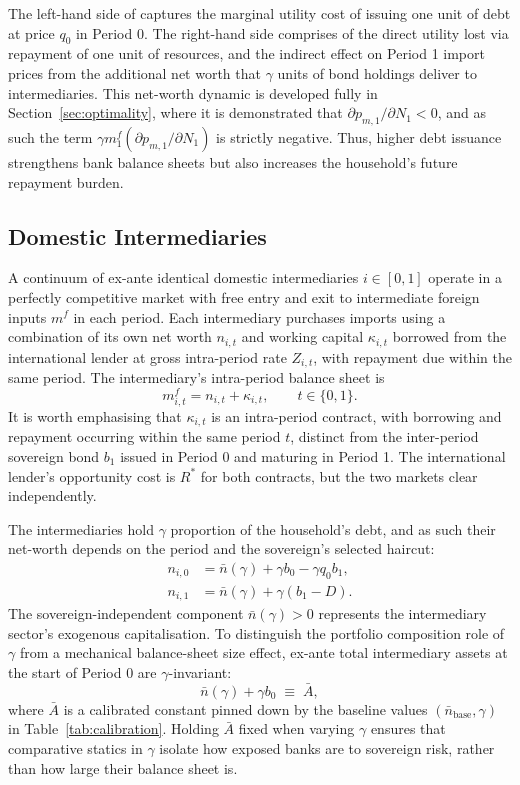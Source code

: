 \documentclass[11pt]{article}
\theoremstyle{definition}
\theoremstyle{plain}
\theoremstyle{remark}
\newcommand{\mf}{m^{f}}
\newcommand{\Rstar}{R^{*}}
\begin{document}
The left-hand side of captures the marginal utility cost of issuing one unit of debt at price $q_0$ in Period 0. The right-hand side comprises of the direct utility lost via repayment of one unit of resources, and the indirect effect on Period 1 import prices from the additional net worth that $\gamma$ units of bond holdings deliver to intermediaries. This net-worth dynamic is developed fully in Section~\ref{sec:optimality}, where it is demonstrated that $\partial p_{m,1}/\partial N_1 < 0$, and as such the term $\gamma \mf_1 (\partial p_{m,1}/\partial N_1)$ is strictly negative. Thus, higher debt issuance strengthens bank balance sheets but also increases the household's future repayment burden.

\subsection{Domestic Intermediaries}\label{sec:intermediary}

A continuum of ex-ante identical domestic intermediaries $i \in [0,1]$ operate in a perfectly competitive market with free entry and exit to intermediate foreign inputs $\mf$ in each period. Each intermediary purchases imports using a combination of its own net worth $n_{i,t}$ and working capital $\kappa_{i,t}$ borrowed from the international lender at gross intra-period rate $Z_{i,t}$, with repayment due within the same period. The intermediary's intra-period balance sheet is
\begin{equation}\label{eq:balsheet}
 \mf_{i,t} = n_{i,t} + \kappa_{i,t}, \qquad t \in \{0,1\}.
\end{equation}
It is worth emphasising that $\kappa_{i,t}$ is an intra-period contract, with borrowing and repayment occurring within the same period $t$, distinct from the inter-period sovereign bond $b_1$ issued in Period 0 and maturing in Period 1. The international lender's opportunity cost is $\Rstar$ for both contracts, but the two markets clear independently.

The intermediaries hold $\gamma$ proportion of the household's debt, and as such their net-worth depends on the period and the sovereign's selected haircut:
\begin{align}
n_{i,0} &= \bar{n}(\gamma) + \gamma b_0 - \gamma q_0 b_1, \label{eq:nw0}\\
n_{i,1} &= \bar{n}(\gamma) + \gamma(b_1 - D). \label{eq:nw1}
\end{align}
The sovereign-independent component $\bar{n}(\gamma) > 0$ represents the intermediary sector's exogenous capitalisation. To distinguish the portfolio composition role of $\gamma$ from a mechanical balance-sheet size effect, ex-ante total intermediary assets at the start of Period 0 are $\gamma$-invariant:
\begin{equation}\label{eq:nbar_rescale}
\bar{n}(\gamma) + \gamma b_0 \;\equiv\; \bar{A},
\end{equation}
where $\bar{A}$ is a calibrated constant pinned down by the baseline values $(\bar{n}_{\text{base}}, \gamma)$ in Table~\ref{tab:calibration}. Holding $\bar{A}$ fixed when varying $\gamma$ ensures that comparative statics in $\gamma$ isolate how exposed banks are to sovereign risk, rather than how large their balance sheet is.
\end{document}
